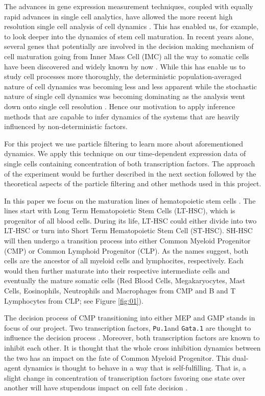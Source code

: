 \documentclass{bioinfo}
\begin{document}
The advances in gene expression measurement techniques, coupled with equally rapid advances in single cell analytics, have allowed the more recent high resolution single cell analysis of cell dynamics \citep{Feigelman16, Hoppe16}. This has enabled us, for example, to look deeper into the dynamics of stem cell maturation. In recent years alone, several genes that potentially are involved in the decision making mechanism of cell maturation going from Inner Mass Cell (IMC) all the way to somatic cells have been discovered and widely known by now \citep{Graf09}. While this has enable us to study cell processes more thoroughly, the deterministic population-averaged nature of cell dynamics was becoming less and less apparent while the stochastic nature of single cell dynamics was becoming dominating as the analysis went down onto single cell resolution \citep{Elowitz02}. Hence our motivation to apply inference methods that are capable to infer dynamics of the systems that are heavily influenced by non-deterministic factors.

For this project we use particle filtering to learn more about aforementioned dynamics. We apply this technique on our time-dependent expression data of single cells containing concentration of both transcription factors. The approach of the experiment would be further described in the next section followed by the theoretical aspects of the particle filtering and other methods used in this project.

In this paper we focus on the maturation lines of hematopoietic stem cells \citep{Orkin08}. The lines start with Long Term Hematopoietic Stem Cells (LT-HSC), which is progenitor of all blood cells. During its life, LT-HSC could either divide into two LT-HSC or turn into Short Term Hematopoietic Stem Cell (ST-HSC). SH-HSC will then undergo a transition process into either Common Myeloid Progenitor (CMP) or Common Lymphoid Progenitor (CLP). As the names suggest, both cells are the ancestor of all myeloid cells and lymphocites, respectively. Each would then further maturate into their respective intermediate cells and eventually the mature somatic cells (Red Blood Cells, Megakaryocytes, Mast Cells, Eosinophils, Neutrophils and Macrophages from CMP and B and T Lymphocytes from CLP; see Figure \ref{fig:01}).

The decision process of CMP transitioning into either MEP and GMP stands in focus of our project. Two transcription factors, \texttt{Pu.1}and \texttt{Gata.1} are thought to influence the decision process \citep{Graf09}. Moreover, both transcription factors are known to inhibit each other. It is thought that the whole cross inhibition dynamics between the two has an impact on the fate of Common Myeloid Progenitor. This dual-agent dynamics is thought to behave in a way that is self-fulfilling. That is, a slight change in concentration of transcription factors favoring one state over another will have stupendous impact on cell fate decision \citep{Filipczyk15}.
\end{document}

